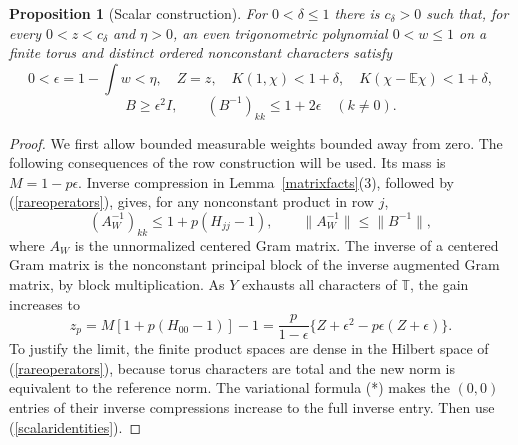 \documentclass[reqno,a4paper,12pt]{amsart}
\newtheorem{proposition}[theorem]{Proposition}
\newcommand{\T}{\mathbb T}
\newcommand{\E}{\mathbb E}
\begin{document}
\begin{proposition}[Scalar construction]\label{scalar}
For $0<\delta\le1$ there is $c_\delta>0$ such that, for every
$0<z<c_\delta$ and $\eta>0$, an even trigonometric polynomial $0<w\le1$
on a finite torus and distinct ordered nonconstant characters satisfy
\[
 0<\epsilon=1-\int w<\eta,\quad Z=z,\quad
 K(1,\chi)<1+\delta,\quad K(\chi-\E\chi)<1+\delta,
\]
\begin{equation}\label{scalarextra}
 B\ge\epsilon^2I,\qquad (B^{-1})_{kk}\le1+2\epsilon\quad(k\ne0).
\end{equation}
\end{proposition}
\begin{proof}
We first allow bounded measurable weights bounded away from zero.
The following consequences of the row construction will be used.
Its mass is $M=1-p\epsilon$. Inverse compression in
Lemma~\ref{matrixfacts}(3), followed by (\ref{rareoperators}), gives,
for any nonconstant product in row $j$,
\begin{equation}\label{rarediagonal}
 (A_W^{-1})_{kk}\le1+p(H_{jj}-1),\qquad
 \|A_W^{-1}\|\le\|B^{-1}\|,
\end{equation}
where $A_W$ is the unnormalized centered Gram matrix.
The inverse of a centered Gram matrix is the nonconstant principal block
of the inverse augmented Gram matrix, by block multiplication.
As $Y$ exhausts all characters of $\T$, the gain increases to
\begin{equation}\label{raregain}
 z_p=M[1+p(H_{00}-1)]-1
 =\frac{p}{1-\epsilon}\{Z+\epsilon^2-p\epsilon(Z+\epsilon)\}.
\end{equation}
To justify the limit, the finite product spaces are dense in the Hilbert
space of (\ref{rareoperators}), because torus characters are total and
the new norm is equivalent to the reference norm. The variational
formula (*) makes the $(0,0)$ entries of their inverse compressions
increase to the full inverse entry. Then use (\ref{scalaridentities}).


\end{proof}
\end{document}
